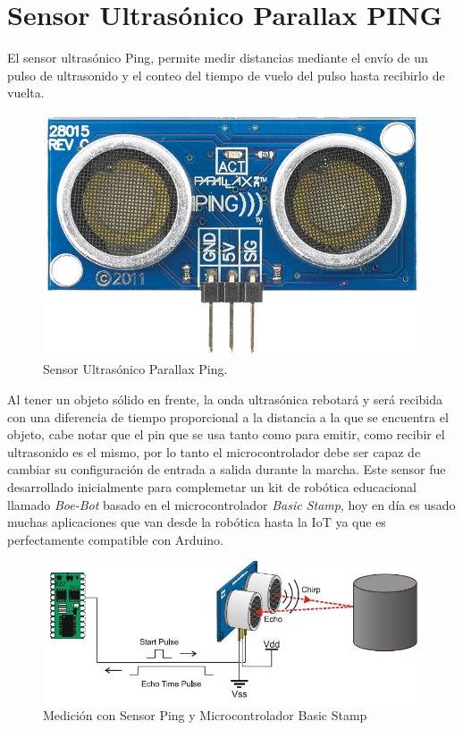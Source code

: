 \documentclass[letterpaper, 10pt]{report}
\begin{document}
\section{Sensor Ultrasónico Parallax PING}\label{pingSec}

El sensor ultrasónico Ping, permite medir distancias mediante el envío de un pulso de ultrasonido y el conteo del tiempo de vuelo del pulso hasta recibirlo de vuelta.

\begin{figure}[h]
\centering
\includegraphics[scale=0.3]{ping.jpg}
\caption{Sensor Ultrasónico Parallax Ping.\label{ping}}
\end{figure}  

Al tener un objeto sólido en frente, la onda ultrasónica rebotará y será recibida con una diferencia de tiempo proporcional a la distancia a la que se encuentra el objeto, cabe notar que el pin que se usa tanto como para emitir, como recibir el ultrasonido es el mismo, por lo tanto el microcontrolador debe ser capaz de cambiar su configuración de entrada a salida durante la marcha. Este sensor fue desarrollado inicialmente para complemetar un kit de robótica educacional llamado \emph{Boe-Bot} basado en el microcontrolador \emph{Basic Stamp}, hoy en día es usado muchas aplicaciones que van desde la robótica hasta la IoT ya que es perfectamente compatible con Arduino.

\begin{figure}[h]
\centering
\includegraphics[scale=0.4]{medicionPing.JPG}
\caption{Medición con Sensor Ping y Microcontrolador Basic Stamp}
\end{figure}
\end{document}
